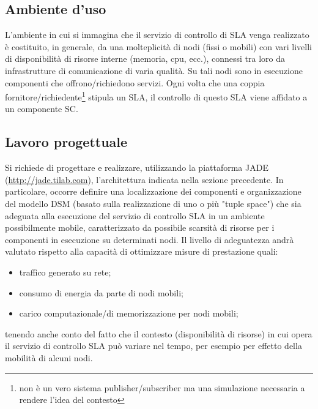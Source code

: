 \subsection{Ambiente d'uso}
L’ambiente in cui si immagina che il servizio di controllo di SLA venga realizzato è costituito, in generale, da una molteplicità di nodi (fissi o mobili) con vari livelli di disponibilità di risorse interne (memoria, cpu, ecc.), connessi tra loro da infrastrutture di comunicazione di varia qualità. Su tali nodi sono in esecuzione componenti che offrono/richiedono servizi. Ogni volta che una coppia fornitore/richiedente\cite{eug}\cite{schiller}\footnote{non è un vero sistema publisher/subscriber ma una simulazione necessaria a rendere l'idea del contesto} stipula un SLA, il controllo di questo SLA viene affidato a un componente SC.
\subsection{Lavoro progettuale}
Si richiede di progettare e realizzare, utilizzando la piattaforma JADE (\url{http://jade.tilab.com}), l’architettura indicata nella sezione precedente. In particolare, occorre definire una localizzazione dei componenti e organizzazione del modello DSM (basato sulla realizzazione di uno o più "tuple space") che sia adeguata alla esecuzione del servizio di controllo SLA in un ambiente possibilmente mobile, caratterizzato da possibile scarsità di risorse per i componenti in esecuzione su determinati nodi. Il livello di adeguatezza andrà valutato rispetto alla capacità di ottimizzare misure di prestazione quali:
\begin{itemize}
\item traffico generato su rete;
\item consumo di energia da parte di nodi mobili;
\item carico computazionale/di memorizzazione per nodi mobili;
\end{itemize}
tenendo anche conto del fatto che il contesto (disponibilità di risorse) in cui opera il servizio di controllo SLA può variare nel tempo, per esempio per effetto della mobilità di alcuni nodi.
